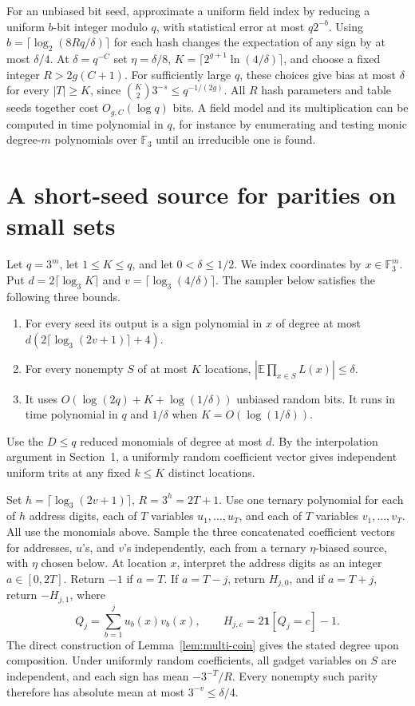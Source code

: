 \documentclass[11pt]{article}
\begin{document}
For an unbiased bit seed, approximate a uniform field index by
reducing a uniform $b$-bit integer modulo $q$, with statistical error at
most $q2^{-b}$. Using $b=\lceil\log_2(8Rq/\delta)\rceil$ for
each hash changes the expectation of any sign by at most
$\delta/4$. At $\delta=q^{-C}$ set $\eta=\delta/8$,
$K=\lceil 2^{g+1}\ln(4/\delta)\rceil$, and choose a fixed
integer $R>2g(C+1)$. For sufficiently large $q$, these choices
give bias at most $\delta$ for every $|T|\ge K$, since
$\binom K2 3^{-s}\le q^{-1/(2g)}$. All $R$ hash parameters and
table seeds together cost $O_{g,C}(\log q)$ bits. A field model
and its multiplication can be computed in time polynomial in $q$,
for instance by enumerating and testing monic degree-$m$
polynomials over $\mathbb F_3$ until an irreducible one is found.
\section{A short-seed source for parities on small sets}
\label{sec:small-parities}

Let $q=3^m$, let $1\le K\le q$, and let $0<\delta\le1/2$.
We index coordinates by $x\in\mathbb F_3^m$. Put
$d=2\lceil\log_3 K\rceil$ and $v=\lceil\log_3(4/\delta)\rceil$.
The sampler below satisfies the following three bounds.
\begin{enumerate}
\item For every seed its output is a sign polynomial in $x$ of degree
at most $d(2\lceil\log_3(2v+1)\rceil+4)$.
\item For every nonempty $S$ of at most $K$ locations,
$|\mathbb E\prod_{x\in S}L(x)|\le\delta$.
\item It uses $O(\log(2q)+K+\log(1/\delta))$ unbiased random bits.
It runs in time polynomial in $q$ and $1/\delta$ when
$K=O(\log(1/\delta))$.
\end{enumerate}

Use the $D\le q$ reduced monomials of degree at most $d$.
By the interpolation argument in Section~1, a uniformly
random coefficient vector gives independent uniform trits at any fixed
$k\le K$ distinct locations.

Set $h=\lceil\log_3(2v+1)\rceil$, $R=3^h=2T+1$. Use one ternary
polynomial for each of $h$ address digits, each of $T$ variables
$u_1,\ldots,u_T$, and each of $T$ variables $v_1,\ldots,v_T$.
All use the monomials above. Sample the three concatenated coefficient
vectors for addresses, $u$'s, and $v$'s independently, each from a
ternary $\eta$-biased source, with $\eta$ chosen below. At location
$x$, interpret the address digits as an integer $a\in[0,2T]$.
Return $-1$ if $a=T$. If $a=T-j$, return $H_{j,0}$, and if $a=T+j$,
return $-H_{j,1}$, where
\[
 Q_j=\sum_{b=1}^j u_b(x)v_b(x),\qquad
 H_{j,c}=2\mathbf1[Q_j=c]-1.
\]
The direct construction of Lemma~\ref{lem:multi-coin} gives the
stated degree upon composition. Under uniformly random coefficients,
all gadget variables on $S$ are independent, and each sign has mean
$-3^{-T}/R$. Every nonempty such parity therefore has absolute mean
at most $3^{-v}\le\delta/4$.
\end{document}
